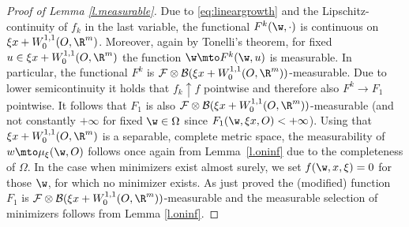 \begin{proof}[Proof of Lemma \ref{l.measurable}]
Due to \eqref{eq:lineargrowth} and the Lipschitz-continuity of $f_k$ in the last variable, the functional $F^k(\w,\cdot)$ is continuous on $\xi x+W_0^{1,1}(O,\R^m)$. Moreover, again by Tonelli's theorem, for fixed $u\in\xi x+W^{1,1}_0(O,\R^m)$ the function $\w\mto F^k(\w,u)$ is measurable. In particular, the functional $F^k$ is $\mathcal{F}\otimes\nobreak\mathcal{B}(\xi x+W^{1,1}_0(O,\R^m))$-measurable. Due to lower semicontinuity it holds that $f_k\uparrow f$ pointwise and therefore also $F^k\to F_1$ pointwise. It follows that $F_1$ is also $\mathcal{F}\otimes\mathcal{B}(\xi x+W^{1,1}_0(O,\R^m))$-measurable (and not constantly $+\infty$ for fixed $\w\in\Omega$ since $F_1(\w,\xi x,O)<+\infty$). Using that $\xi x+W_0^{1,1}(O,\R^m)$ is a separable, complete metric space, the measurability of $w\mto\mu_{\xi}(\w,O)$ follows once again from Lemma~\ref{l.oninf} due to the completeness of $\Omega$. In the case when minimizers exist almost surely, we set $f(\w,x,\xi)=0$ for those $\w$, for which no minimizer exists. As just proved the (modified) function $F_1$ is $\mathcal{F}\otimes\mathcal{B}(\xi x+W^{1,1}_0(O,\R^m))$-measurable and the measurable selection of minimizers follows from Lemma \ref{l.oninf}.
\end{proof}
